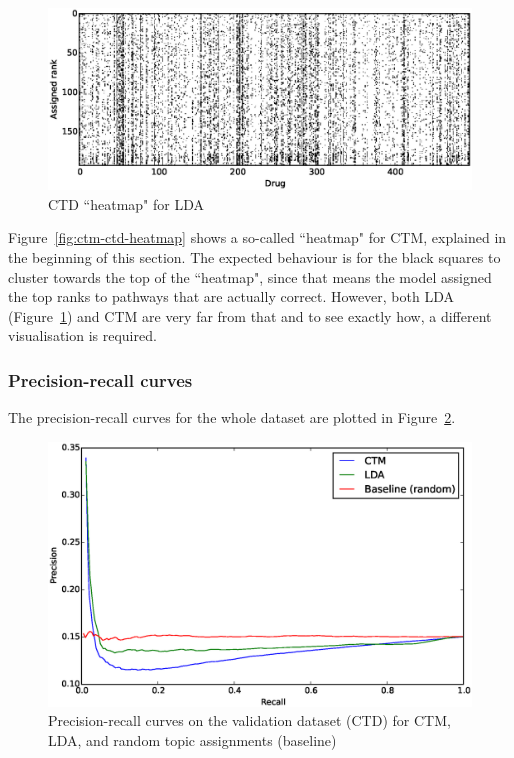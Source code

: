 \documentclass[12pt,a4paper,twoside,openright]{report}
\begin{document}
\begin{figure}[!htb]
\includegraphics[width=\textwidth]{lda-ctd-heatmap.eps}
\caption{CTD ``heatmap" for LDA}
\label{fig:lda-ctd-heatmap}
\end{figure}

Figure~\ref{fig:ctm-ctd-heatmap} shows a so-called ``heatmap" for CTM, explained in the beginning of this section. The expected behaviour is for the black squares to cluster towards the top of the ``heatmap", since that means the model assigned the top ranks to pathways that are actually correct. However, both LDA (Figure~\ref{fig:lda-ctd-heatmap}) and CTM are very far from that and to see exactly how, a different visualisation is required.


\subsubsection{Precision-recall curves}

The precision-recall curves for the whole dataset are plotted in Figure~\ref{fig:ctd-pr-curves}.

\begin{figure}[!htb]
\includegraphics[width=\textwidth]{ctd-pr-curves.eps}
\caption{Precision-recall curves on the validation dataset (CTD) for CTM, LDA, and random topic assignments (baseline)}
\label{fig:ctd-pr-curves}
\end{figure}
\end{document}
